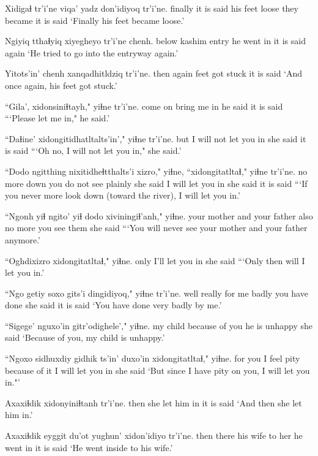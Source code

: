 \documentclass[12pt]{article}
\begin{document}
\gll Xidigaɬ tr'i'ne viqa'  yadz don'idiyoq tr'i'ne.
finally  {it is said} {his feet}  loose {they became} {it is said}
\glt `Finally his feet became loose.'
\glend

\gll Ngiyiq tthaɬyiq xiyegheyo tr'i'ne chenh.
below  {kashim entry} {he went in} {it is said} again
\glt `He tried to go into the entryway again.'
\glend

\gll Yitots'in' chenh xanqadhitldziq tr'i'ne.
then  again {feet got stuck} {it is said}
\glt `And once again, his feet got stuck.'
\glend

\gll ``Gila', xidonsiniɬtayh," yiɬne  tr'i'ne.
{come on} {bring me in} {he said}  {it is said}
\glt ```Please let me in," he said.'
\glend

\gll ``Daɬine' {xidongitidhatltalts'in',"} {yiɬne}  tr'i'ne.
but  {I will not let you in}   {she said} {it is said}
\glt ```Oh no, I will not let you in," she said.'
\glend

\gll ``Dodo ngitthing   nixitidheɬtthalts'i xizro," yiɬne,  ``xidongitatltaɬ," yiɬne  tr'i'ne.
{no more} {down} {you do not see}  plainly {she said} {I will let you in} {she said} {it is said}
\glt ```If you never more look down (toward the river), I will let you in.'
\glend

\gll ``Ngonh yiɬ ngito'  yiɬ dodo  xiviningiɬ'anh," yiɬne.
{your mother} and {your father} also {no more} {you see them} {she said}
\glt ```You will never see your mother and your father anymore.'
\glend

\gll ``Oghdixizro xidongitatltaɬ," yiɬne.
only {I'll let you in} {she said}
\glt ```Only then will I let you in.'
\glend

\gll ``Ngo getiy soxo gits'i dingidiyoq," yiɬne  tr'i'ne.
well really {for me} badly {you have done} {she said} {it is said}
\glt `You have done very badly by me.'
\glend

\gll ``Sigege' nguxo'in  gitr'odighele'," yiɬne.
{my child} {because of you} {he is unhappy} {she said}
\glt `Because of you, my child is unhappy.'
\glend

\gll ``Ngoxo {sidhuxdiy gidhik} ts'in' duxo'in xidongitatltaɬ," yiɬne.
{for you} {I feel pity} {} {because of it} {I will let you in} {she said}
\glt `But since I have pity on you, I will let you in."'
\glend

\gll Axaxiɬdik xidonyiniɬtanh tr'i'ne.
then  {she let him in}  {it is said}
\glt `And then she let him in.'
\glend

\gll Axaxiɬdik eyggit du'ot  yughun' xidon'idiyo tr'i'ne.
then  there  {his wife} {to her} {he went in} {it is said}
\glt `He went inside to his wife.'
\glend
\end{document}
